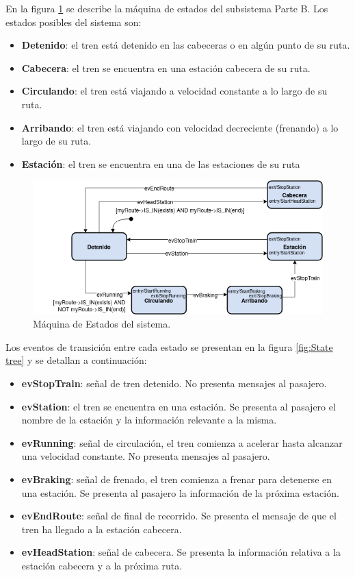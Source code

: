 \documentclass[
11pt, %
]{charter}
\begin{document}
En la figura \ref{fig:Statechart} se describe la máquina de estados del subsistema Parte B. Los estados posibles
del sistema son:
\begin{itemize}
\item \textbf{Detenido}: el tren está detenido en las cabeceras o en algún punto de su ruta.
\item \textbf{Cabecera}: el tren se encuentra en una estación cabecera de su ruta.
\item \textbf{Circulando}: el tren está viajando a velocidad constante a lo largo de su ruta.
\item \textbf{Arribando}: el tren está viajando con velocidad decreciente (frenando) a lo largo de su
ruta.
\item \textbf{Estación}: el tren se encuentra en una de las estaciones de su ruta
\end{itemize}

\begin{figure}[htpb]
\centering 
\includegraphics[width=1\textwidth]{./Pics/Statechart.png}
\caption{Máquina de Estados del sistema.}
\label{fig:Statechart}
\end{figure}

Los eventos de transición entre cada estado se presentan en la figura \ref{fig:State tree} y se detallan a continuación:

\begin{itemize}
\item \textbf{evStopTrain}: señal de tren detenido. No presenta mensajes al pasajero.
\item \textbf{evStation}: el tren se encuentra en una estación. Se presenta al pasajero el nombre de
la estación y la información relevante a la misma.
\item \textbf{evRunning}: señal de circulación, el tren comienza a acelerar hasta alcanzar una
velocidad constante. No presenta mensajes al pasajero.
\item \textbf{evBraking}: señal de frenado, el tren comienza a frenar para detenerse en una estación.
Se presenta al pasajero la información de la próxima estación.
\item \textbf{evEndRoute}: señal de final de recorrido. Se presenta el mensaje de que el tren ha
llegado a la estación cabecera.
\item \textbf{evHeadStation}: señal de cabecera. Se presenta la información relativa a la estación cabecera y a la próxima ruta.
\end{itemize}
\end{document}
